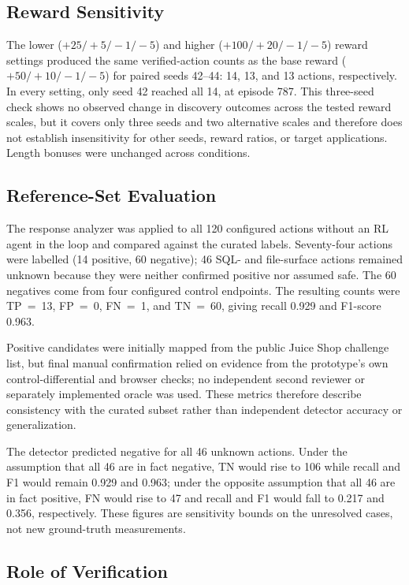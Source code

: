 \documentclass[conference, a4paper]{IEEEtran}
\begin{document}
\subsection{Reward Sensitivity}
\label{sec:reward-sensitivity}

The lower ($+25/+5/-1/-5$) and higher ($+100/+20/-1/-5$) reward
settings produced the same verified-action counts as the base
reward ($+50/+10/-1/-5$) for paired seeds 42--44: 14, 13, and 13
actions, respectively. In every setting, only seed 42 reached all
14, at episode 787. This three-seed check shows no observed change
in discovery outcomes across the tested reward scales, but it
covers only three seeds and two alternative scales and therefore
does not establish insensitivity for other seeds, reward ratios, or
target applications. Length bonuses were unchanged across
conditions.

\subsection{Reference-Set Evaluation}

The response analyzer was applied to all 120 configured actions
without an RL agent in the loop and compared against the curated
labels. Seventy-four actions were labelled (14 positive, 60
negative); 46 SQL- and file-surface actions remained unknown
because they were neither confirmed positive nor assumed safe. The
60 negatives come from four configured control endpoints. The
resulting counts were TP~=~13, FP~=~0, FN~=~1, and TN~=~60, giving
recall 0.929 and F1-score 0.963.

Positive candidates were initially mapped from the public Juice
Shop challenge list, but final manual confirmation relied on
evidence from the prototype's own control-differential and browser
checks; no independent second reviewer or separately implemented
oracle was used. These metrics therefore describe consistency with
the curated subset rather than independent detector accuracy or
generalization.

The detector predicted negative for all 46 unknown actions. Under
the assumption that all 46 are in fact negative, TN would rise to
106 while recall and F1 would remain 0.929 and 0.963; under the
opposite assumption that all 46 are in fact positive, FN would rise
to 47 and recall and F1 would fall to 0.217 and 0.356, respectively.
These figures are sensitivity bounds on the unresolved cases, not
new ground-truth measurements.

\subsection{Role of Verification}
\end{document}
